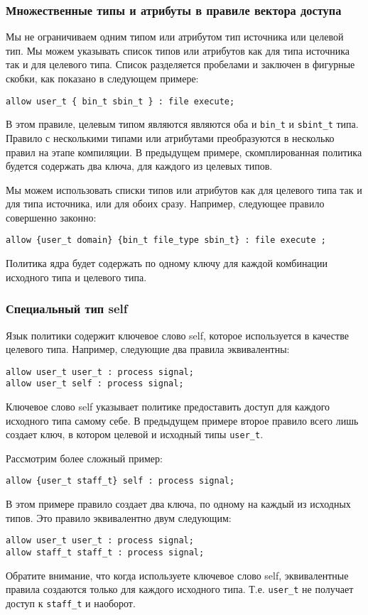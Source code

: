 \documentclass{./../class/UIR}
\begin{document}
\subsubsection{Множественные типы и атрибуты в правиле вектора доступа}

    Мы не ограничиваем одним типом или атрибутом тип источника или целевой тип.
    Мы можем указывать список типов или атрибутов как для типа источника так и
    для целевого типа. Список разделяется пробелами и заключен в фигурные
    скобки, как показано в следующем примере:
\begin{verbatim}
allow user_t { bin_t sbin_t } : file execute;
\end{verbatim}
    В этом правиле, целевым типом являются являются оба и \verb"bin_t" и
    \verb"sbint_t" типа. Правило с несколькими типами или атрибутами
    преобразуются в несколько правил на этапе компиляции. В предыдущем примере,
    скомплированная политика будется содержать два ключа, для каждого из целевых
    типов.

    Мы можем использовать списки типов или атрибутов как для целевого типа так и
    для типа источника, или для обоих сразу. Например, следующее правило
    совершенно законно:
\begin{verbatim}
allow {user_t domain} {bin_t file_type sbin_t} : file execute ;
\end{verbatim}
    Политика ядра будет содержать по одному ключу для каждой комбинации
    исходного типа и целевого типа.

\subsubsection{Специальный тип self}

    Язык политики содержит ключевое слово self, которое используется в качестве
    целевого типа. Например, следующие два правила эквивалентны:
\begin{verbatim}
allow user_t user_t : process signal;
allow user_t self : process signal;
\end{verbatim}
    Ключевое слово self указывает политике предоставить доступ для каждого
    исходного типа самому себе. В предыдущем примере второе правило всего лишь
    создает ключ, в котором целевой и исходный типы \verb"user_t".

    Рассмотрим более сложный пример:
\begin{verbatim}
allow {user_t staff_t} self : process signal;
\end{verbatim}
    В этом примере правило создает два ключа, по одному на каждый из исходных
    типов. Это правило эквивалентно двум следующим:
\begin{verbatim}
allow user_t user_t : process signal;
allow staff_t staff_t : process signal;
\end{verbatim}
    Обратите внимание, что когда используете ключевое слово self, эквивалентные
    правила создаются только для каждого исходного типа. Т.е. \verb"user_t" не
    получает доступ к \verb"staff_t" и наоборот.
\end{document}
